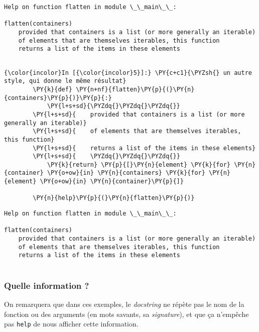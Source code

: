     \begin{Verbatim}[commandchars=\\\{\}]
Help on function flatten in module \_\_main\_\_:

flatten(containers)
    provided that containers is a list (or more generally an iterable)
    of elements that are themselves iterables, this function
    returns a list of the items in these elements


    \end{Verbatim}

    \begin{Verbatim}[commandchars=\\\{\}]
{\color{incolor}In [{\color{incolor}5}]:} \PY{c+c1}{\PYZsh{} un autre style, qui donne le même résultat}
        \PY{k}{def} \PY{n+nf}{flatten}\PY{p}{(}\PY{n}{containers}\PY{p}{)}\PY{p}{:}
            \PY{l+s+sd}{\PYZdq{}\PYZdq{}\PYZdq{}}
        \PY{l+s+sd}{    provided that containers is a list (or more generally an iterable)}
        \PY{l+s+sd}{    of elements that are themselves iterables, this function}
        \PY{l+s+sd}{    returns a list of the items in these elements}
        \PY{l+s+sd}{    \PYZdq{}\PYZdq{}\PYZdq{}}
            \PY{k}{return} \PY{p}{[}\PY{n}{element} \PY{k}{for} \PY{n}{container} \PY{o+ow}{in} \PY{n}{containers} \PY{k}{for} \PY{n}{element} \PY{o+ow}{in} \PY{n}{container}\PY{p}{]}
        
        \PY{n}{help}\PY{p}{(}\PY{n}{flatten}\PY{p}{)}
\end{Verbatim}


    \begin{Verbatim}[commandchars=\\\{\}]
Help on function flatten in module \_\_main\_\_:

flatten(containers)
    provided that containers is a list (or more generally an iterable)
    of elements that are themselves iterables, this function
    returns a list of the items in these elements


    \end{Verbatim}

    \hypertarget{quelle-information}{%
\subsubsection{Quelle information ?}\label{quelle-information}}

    On remarquera que dans ces exemples, le \emph{docstring} ne répète pas
le nom de la fonction ou des arguments (en mots savants, sa
\emph{signature}), et que ça n'empêche pas \texttt{help} de nous
afficher cette information.

